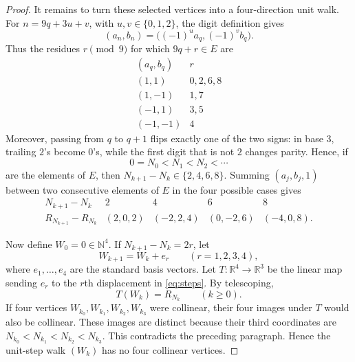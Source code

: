 \documentclass[11pt]{article}
\newcommand{\N}{\mathbb N}
\begin{document}
\begin{proof}
It remains to turn these selected vertices into a four-direction unit
walk. For $n=9q+3u+v$, with $u,v\in\{0,1,2\}$, the digit definition gives
\begin{equation}\label{eq:9}
 (a_n,b_n)=\bigl((-1)^u a_q,(-1)^v b_q\bigr).
\end{equation}
Thus the residues $r\pmod9$ for which $9q+r\in E$ are
\[
\begin{array}{c|c}
(a_q,b_q)&r\\ \hline
(1,1)&0,2,6,8\\
(1,-1)&1,7\\
(-1,1)&3,5\\
(-1,-1)&4
\end{array}
\]
Moreover, passing from $q$ to $q+1$ flips exactly one of the two signs:
in base $3$, trailing $2$'s become $0$'s, while the first digit that is
not $2$ changes parity. Hence, if
\[
 0=N_0<N_1<N_2<\cdots
\]
are the elements of $E$, then $N_{k+1}-N_k\in\{2,4,6,8\}$. Summing
$(a_j,b_j,1)$ between two consecutive elements of $E$ in the four
possible cases gives
\begin{equation}\label{eq:steps}
\begin{array}{c|cccc}
N_{k+1}-N_k&2&4&6&8\\ \hline
R_{N_{k+1}}-R_{N_k}
 &(2,0,2)&(-2,2,4)&(0,-2,6)&(-4,0,8).
\end{array}
\end{equation}

Now define $W_0=0\in\N^4$. If $N_{k+1}-N_k=2r$, let
\[
 W_{k+1}=W_k+e_r\qquad (r=1,2,3,4),
\]
where $e_1,\ldots,e_4$ are the standard basis vectors. Let
$T:\mathbb R^4\to\mathbb R^3$ be the linear map sending $e_r$ to the
$r$th displacement in \eqref{eq:steps}. By telescoping,
\[
 T(W_k)=R_{N_k}\qquad(k\ge0).
\]
If four vertices $W_{k_0},W_{k_1},W_{k_2},W_{k_3}$ were collinear,
their four images under $T$ would also be collinear. These images are
distinct because their third coordinates are
$N_{k_0}<N_{k_1}<N_{k_2}<N_{k_3}$. This contradicts the preceding
paragraph. Hence the unit-step walk $(W_k)$ has no four collinear
vertices.
\end{proof}
\end{document}

